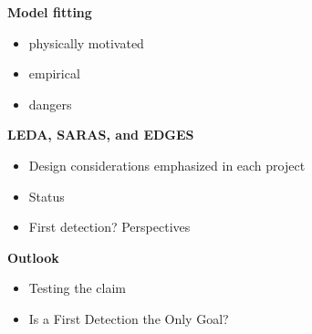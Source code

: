 
\textbf{Model fitting}

\begin{itemize}


    \item
      physically motivated
    \item
      empirical
    \item
      dangers

\end{itemize}

\textbf{LEDA, SARAS, and EDGES}

\begin{itemize}
    \item
      Design considerations emphasized in each project
    \item
      Status
\end{itemize}

\begin{itemize}
    \item
      First detection?  Perspectives
\end{itemize}

\textbf{Outlook}

\begin{itemize}
    \item
      Testing the claim
    \item
      Is a First Detection the Only Goal?
\end{itemize}




%



